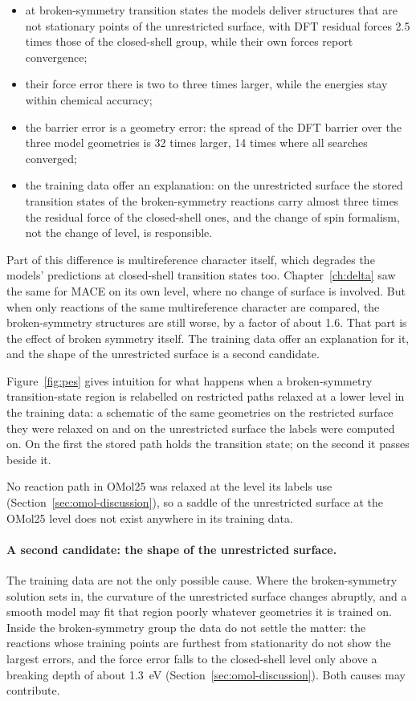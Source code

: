 \begin{itemize}
  \item at broken-symmetry transition states the models deliver
    structures that are not stationary points of the unrestricted
    surface, with DFT residual forces 2.5 times those of the
    closed-shell group, while their own forces report convergence;
  \item their force error there is two to three times larger, while
    the energies stay within chemical accuracy;
  \item the barrier error is a geometry error: the spread of the DFT
    barrier over the three model geometries is 32 times larger, 14
    times where all searches converged;
  \item the training data offer an explanation: on the unrestricted
    surface the stored transition states of the broken-symmetry
    reactions carry almost three times the residual force of the
    closed-shell ones, and the change of spin formalism, not the
    change of level, is responsible.
\end{itemize}

Part of this difference is multireference character itself, which
degrades the models' predictions at closed-shell transition states
too. Chapter~\ref{ch:delta} saw the same for MACE on its own level,
where no change of surface is involved. But when only reactions of the
same multireference character are
compared, the broken-symmetry structures are still worse, by a factor
of about 1.6. That part is the effect of broken symmetry itself. The
training data offer an explanation for it, and the shape of the
unrestricted surface is a second candidate.

Figure~\ref{fig:pes} gives intuition for what happens when a
broken-symmetry transition-state region is relabelled on restricted
paths relaxed at a lower level in the training data: a schematic of the same
geometries on the restricted surface they were relaxed on and on the
unrestricted surface the labels were computed on. On the first the
stored path holds the transition state; on the second it passes
beside it.

No reaction path in OMol25 was relaxed at the level its labels use
(Section~\ref{sec:omol-discussion}), so a saddle of the unrestricted
surface at the OMol25 level does not exist anywhere in its training
data.

\paragraph{A second candidate: the shape of the unrestricted surface.}
The training data are not the only possible cause. Where the
broken-symmetry solution sets in, the curvature of the unrestricted
surface changes abruptly, and a smooth model may fit that region poorly
whatever geometries it is trained on. Inside the broken-symmetry group
the data do not settle the matter: the reactions whose training points
are furthest from stationarity do not show the largest errors, and the
force error falls to the closed-shell level only above a breaking depth
of about 1.3~eV (Section~\ref{sec:omol-discussion}). Both causes may
contribute.

